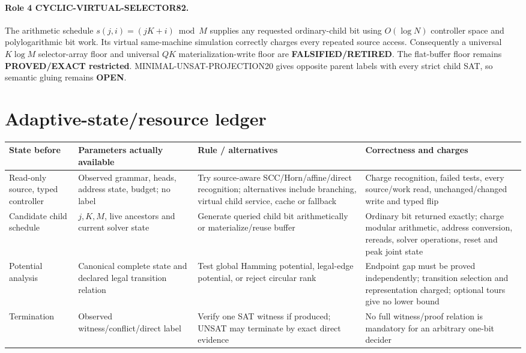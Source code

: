 \documentclass[11pt]{article}
\newcommand{\OPEN}{\textbf{OPEN}}
\begin{document}
\paragraph{Role 4 CYCLIC-VIRTUAL-SELECTOR82.}
The arithmetic schedule
$s(j,i)=(jK+i)\bmod M$ supplies any requested ordinary-child bit using
$O(\log N)$ controller space and polylogarithmic bit work.  Its virtual
same-machine simulation correctly charges every repeated source access.
Consequently a universal $K\log M$ selector-array floor and universal $QK$
materialization-write floor are \textbf{FALSIFIED/RETIRED}.  The flat-buffer
floor remains \textbf{PROVED/EXACT restricted}.  MINIMAL-UNSAT-PROJECTION20
gives opposite parent labels with every strict child SAT, so semantic gluing
remains \OPEN{}.

\section{Adaptive-state/resource ledger}

\begin{center}\small
\begin{tabular}{p{.17\linewidth}p{.24\linewidth}p{.27\linewidth}p{.24\linewidth}}
\toprule
State before & Parameters actually available & Rule / alternatives & Correctness and charges\\\midrule
Read-only source, typed controller & Observed grammar, heads, address state, budget; no label & Try source-aware SCC/Horn/affine/direct recognition; alternatives include branching, virtual child service, cache or fallback & Charge recognition, failed tests, every source/work read, unchanged/changed write and typed flip\\
Candidate child schedule & $j,K,M$, live ancestors and current solver state & Generate queried child bit arithmetically or materialize/reuse buffer & Ordinary bit returned exactly; charge modular arithmetic, address conversion, rereads, solver operations, reset and peak joint state\\
Potential analysis & Canonical complete state and declared legal transition relation & Test global Hamming potential, legal-edge potential, or reject circular rank & Endpoint gap must be proved independently; transition selection and representation charged; optional tours give no lower bound\\
Termination & Observed witness/conflict/direct label & Verify one SAT witness if produced; UNSAT may terminate by exact direct evidence & No full witness/proof relation is mandatory for an arbitrary one-bit decider\\
\bottomrule
\end{tabular}
\end{center}
\end{document}
